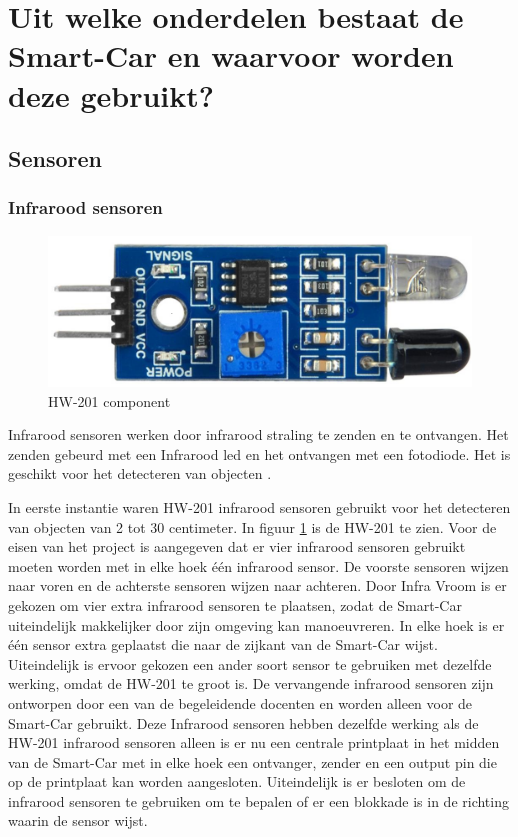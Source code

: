 \section{Uit welke onderdelen bestaat de Smart-Car en waarvoor worden deze gebruikt?}
\subsection{Sensoren}
\subsubsection{Infrarood sensoren}
\begin{figure}[h]
    \centering
    \includegraphics[scale = 0.35]{Media/Figuren/HW-201.jpg}
    \caption{HW-201 component}
    \label{HW-201}
\end{figure}
Infrarood sensoren werken door infrarood straling te zenden en te ontvangen. Het zenden gebeurd met een Infrarood led en het ontvangen met een fotodiode. Het is geschikt voor het detecteren van objecten \cite{IR-datasheet}.

In eerste instantie waren HW-201 infrarood sensoren gebruikt voor het detecteren van objecten van 2 tot 30 centimeter. In figuur \ref{HW-201}\cite{HW-201-hardware} is de HW-201 te zien. Voor de eisen van het project is aangegeven dat er vier infrarood sensoren gebruikt moeten worden met in elke hoek één infrarood sensor. De voorste sensoren wijzen naar voren en de achterste sensoren wijzen naar achteren. Door Infra Vroom is er gekozen om vier extra infrarood sensoren te plaatsen, zodat de \gls{Smart-Car} uiteindelijk makkelijker door zijn omgeving kan manoeuvreren. In elke hoek is er één sensor extra geplaatst die naar de zijkant van de \gls{Smart-Car} wijst. Uiteindelijk is ervoor gekozen een ander soort sensor te gebruiken met dezelfde werking, omdat de HW-201 te groot is. De vervangende infrarood sensoren zijn ontworpen door een van de begeleidende docenten en worden alleen voor de \gls{Smart-Car} gebruikt. Deze Infrarood sensoren hebben dezelfde werking als de HW-201 infrarood sensoren alleen is er nu een centrale printplaat in het midden van de \gls{Smart-Car} met in elke hoek een ontvanger, zender en een output pin die op de printplaat kan worden aangesloten. Uiteindelijk is er besloten om de infrarood sensoren te gebruiken om te bepalen of er een blokkade is in de richting waarin de sensor wijst.
